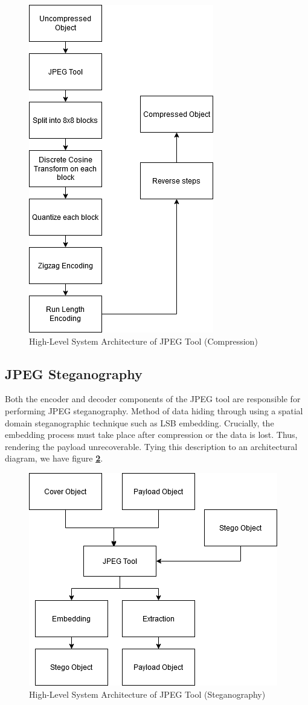 \documentclass{l4proj}
\begin{document}
\begin{figure}[]
    \centering
    \includegraphics[width=0.5\linewidth]{images/jpeg_compression_architecture.png}    
    \caption{High-Level System Architecture of JPEG Tool (Compression)}
    \label{fig:hlsa_jpeg_compress} 
\end{figure}

\subsection{JPEG Steganography}

Both the encoder and decoder components of the JPEG tool are responsible for performing JPEG steganography. Method of data hiding through using a spatial domain steganographic technique such as LSB embedding. Crucially, the embedding process must take place after compression or the data is lost. Thus, rendering the payload unrecoverable. Tying this description to an architectural diagram, we have figure \textbf{\ref{fig:hlsa_jpeg_steg}}.

\begin{figure}[]
    \centering
    \includegraphics[width=0.6\linewidth]{images/jpeg_steganography_architecture.png}    
    \caption{High-Level System Architecture of JPEG Tool (Steganography)}
    \label{fig:hlsa_jpeg_steg} 
\end{figure}
\end{document}
